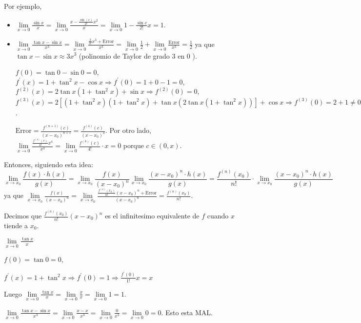 Por ejemplo,
\begin{itemize}
	\item \(\lim\limits_{x  \to 0 } \frac{\sin x }{x }= \lim\limits_{x  \to 0 } \frac{x - \frac{\sin (c )}{2! }x^{2} }{x} = \lim\limits_{x  \to 0 } 1 - \frac{\sin c }{2! }x = 1\).
	\item \(\lim\limits_{x  \to 0 } \frac{\tan x - \sin x }{x^{3} } = \lim\limits_{x  \to 0 } \frac{\frac{3}{3!}x^{3} + \text{Error}  }{x^{3} } = \lim\limits_{x  \to 0 } \frac{1}{2} + \lim\limits_{x  \to 0 } \frac{\text{Error}  }{x^{3} } = \frac{1}{2}\) ya que \(\tan x - \sin x \approx 3x^{3 } \) (polinomio de Taylor de grado \(3 \) en \(0 \) ).

	      \(f(0) = \tan 0 - \sin 0 = 0 \), \(f^\prime (x) = 1 + \tan^{2}x - \cos x \Rightarrow f^\prime (0) = 1 + 0 -1 = 0 \), \(f^{(2)}(x) = 2 \tan x (1 + \tan^{2} x ) + \sin x \Rightarrow f^{(2)}(0) = 0  \), \(f^{(3)}(x) = 2[(1 + \tan^{2}x )(1 + \tan^{2}x ) + \tan x (2\tan x (1 + \tan^{2} x))] + \cos x \Rightarrow f^{(3)}(0) = 2 + 1 \neq 0 \).

	      \(\text{Error}  = \frac{f^{(n + 1)}(c) }{(x - x_0)^{n + 1} } = \frac{f^{(4)}(c) }{(x - x_0)^{4} }\). Por otro lado,  \(\lim\limits_{x  \to 0 } \frac{\frac{f^{(4)}(c) }{4!}x^{4} }{x^{3} } = \lim\limits_{x \to 0} \frac{f^{(4)}(c)}{4!} \cdot x = 0\) porque \(c \in (0,x)\).
\end{itemize}
Entonces, siguiendo esta idea:
\[
	\lim\limits_{x  \to x_0 } \frac{f(x) \cdot h(x)}{g(x)} = \lim\limits_{x  \to x_0 } \frac{f(x)}{(x - x_0)^{n} } \lim\limits_{x  \to x_0 } \frac{(x - x_0)^{n} \cdot h(x) }{g(x)} = \frac{f^{(n)}(x_0) }{n!} \cdot \lim\limits_{x  \to x_0 } \frac{(x - x_0)^{n} \cdot h(x) }{g(x)}
\]
ya que \(\lim\limits_{x  \to x_0 } \frac{f(x )}{(x - x_0)^{n} } = \lim\limits_{x  \to x_0 } \frac{\frac{f^{(n)}(x_0) }{n!}(x - x_0)^{n} + \text{Error} }{(x - x_0)^{n} } = \frac{f^{(n)}(x_0) }{n!}\).

Decimos que \(\frac{f^{(n)}(x_0) }{n!}(x - x_0)^{n} \) es el infinitesimo equivalente de \(f \) cuando \(x \) tiende a \(x_0 \).

\begin{example}
	\(\lim\limits_{x \to 0} \frac{\tan x }{x } \)

	\(f(0) = \tan 0 = 0 \),

	\(f^\prime (x) = 1 + \tan^{2}x \Rightarrow f^\prime (0) = 1 \Rightarrow \frac{f^\prime (0)}{1!} x = x \)

	Luego \(\lim\limits_{x \to 0} \frac{\tan x }{x } = \lim\limits_{x  \to 0 } \frac{x }{x } = \lim\limits_{x  \to 0 } 1 = 1 \).
\end{example}
\begin{example}
	\(\lim\limits_{x  \to 0 } \frac{\tan x - \sin x }{x^{3} } = \lim\limits_{x  \to 0 } \frac{x - x }{x^{3} } = \lim\limits_{x  \to 0 } \frac{0 }{x^{3} } = \lim\limits_{x  \to 0 } 0 = 0 \). Esto esta MAL.
\end{example}

